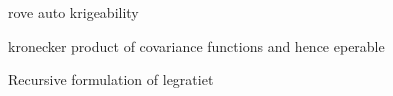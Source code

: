 rove auto krigeability

kronecker product of covariance functions and hence eperable

Recursive formulation of legratiet